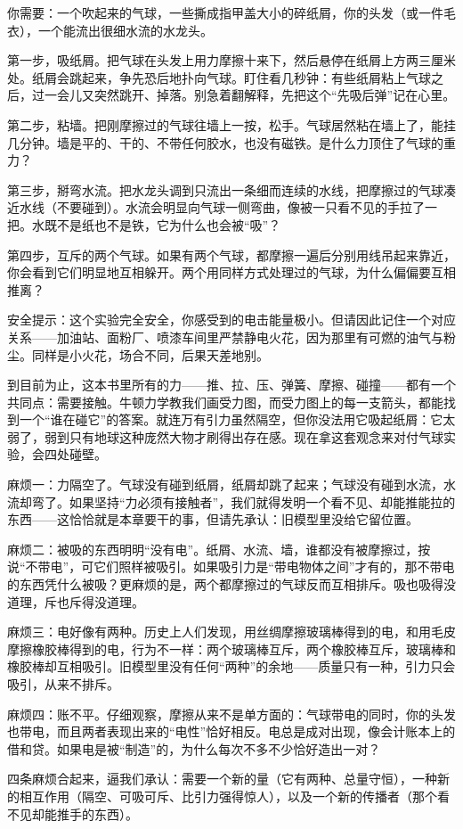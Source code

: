 
\begin{experiment}[一个气球的静电秀]
你需要：一个吹起来的气球，一些撕成指甲盖大小的碎纸屑，你的头发（或一件毛衣），一个能流出很细水流的水龙头。

第一步，吸纸屑。把气球在头发上用力摩擦十来下，然后悬停在纸屑上方两三厘米处。纸屑会跳起来，争先恐后地扑向气球。盯住看几秒钟：有些纸屑粘上气球之后，过一会儿又突然跳开、掉落。别急着翻解释，先把这个“先吸后弹”记在心里。

第二步，粘墙。把刚摩擦过的气球往墙上一按，松手。气球居然粘在墙上了，能挂几分钟。墙是平的、干的、不带任何胶水，也没有磁铁。是什么力顶住了气球的重力？

第三步，掰弯水流。把水龙头调到只流出一条细而连续的水线，把摩擦过的气球凑近水线（不要碰到）。水流会明显向气球一侧弯曲，像被一只看不见的手拉了一把。水既不是纸也不是铁，它为什么也会被“吸”？

第四步，互斥的两个气球。如果有两个气球，都摩擦一遍后分别用线吊起来靠近，你会看到它们明显地互相躲开。两个用同样方式处理过的气球，为什么偏偏要互相推离？

安全提示：这个实验完全安全，你感受到的电击能量极小。但请因此记住一个对应关系——加油站、面粉厂、喷漆车间里严禁静电火花，因为那里有可燃的油气与粉尘。同样是小火花，场合不同，后果天差地别。
\end{experiment}


\begin{mainline}
到目前为止，这本书里所有的力——推、拉、压、弹簧、摩擦、碰撞——都有一个共同点：需要接触。牛顿力学教我们画受力图，而受力图上的每一支箭头，都能找到一个“谁在碰它”的答案。就连万有引力虽然隔空，但你没法用它吸起纸屑：它太弱了，弱到只有地球这种庞然大物才刷得出存在感。现在拿这套观念来对付气球实验，会四处碰壁。

麻烦一：力隔空了。气球没有碰到纸屑，纸屑却跳了起来；气球没有碰到水流，水流却弯了。如果坚持“力必须有接触者”，我们就得发明一个看不见、却能推能拉的东西——这恰恰就是本章要干的事，但请先承认：旧模型里没给它留位置。

麻烦二：被吸的东西明明“没有电”。纸屑、水流、墙，谁都没有被摩擦过，按说“不带电”，可它们照样被吸引。如果吸引力是“带电物体之间”才有的，那不带电的东西凭什么被吸？更麻烦的是，两个都摩擦过的气球反而互相排斥。吸也吸得没道理，斥也斥得没道理。

麻烦三：电好像有两种。历史上人们发现，用丝绸摩擦玻璃棒得到的电，和用毛皮摩擦橡胶棒得到的电，行为不一样：两个玻璃棒互斥，两个橡胶棒互斥，玻璃棒和橡胶棒却互相吸引。旧模型里没有任何“两种”的余地——质量只有一种，引力只会吸引，从来不排斥。

麻烦四：账不平。仔细观察，摩擦从来不是单方面的：气球带电的同时，你的头发也带电，而且两者表现出来的“电性”恰好相反。电总是成对出现，像会计账本上的借和贷。如果电是被“制造”的，为什么每次不多不少恰好造出一对？

四条麻烦合起来，逼我们承认：需要一个新的量（它有两种、总量守恒），一种新的相互作用（隔空、可吸可斥、比引力强得惊人），以及一个新的传播者（那个看不见却能推手的东西）。
\end{mainline}

